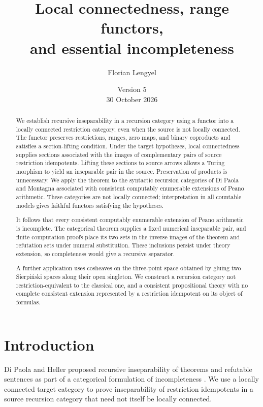 \documentclass[11pt]{article}
\title{Local connectedness, range functors,\\
and essential incompleteness}
\author{Florian Lengyel}
\date{Version 5\\30 October 2026}
\begin{document}
\maketitle

\begin{abstract}
We establish recursive inseparability in a recursion category using a
functor into a locally connected restriction category, even when the
source is not locally connected. The functor preserves restrictions,
ranges, zero maps, and binary coproducts and satisfies a section-lifting
condition. Under the target hypotheses, local
connectedness supplies sections associated with the images of
complementary pairs of source restriction idempotents. Lifting these
sections to source arrows allows a Turing morphism to yield an
inseparable pair in the source. Preservation of products is unnecessary.
We apply the theorem to the syntactic recursion categories of Di Paola
and Montagna associated with consistent computably enumerable extensions
of Peano arithmetic. These categories are not locally connected;
interpretation in all countable models gives faithful functors
satisfying the hypotheses.

It follows that every consistent computably enumerable
extension of Peano arithmetic is incomplete. The categorical theorem
supplies a fixed numerical inseparable pair, and finite computation
proofs place its two sets in the inverse images of the theorem and
refutation sets under numeral substitution. These inclusions persist
under theory extension, so completeness would give a recursive separator.

A further application uses cosheaves on the three-point space obtained
by gluing two Sierpi\'nski spaces along their open singleton. We construct
a recursion category not restriction-equivalent to the classical one,
and a consistent propositional theory with no complete consistent
extension represented by a restriction idempotent on its object of
formulas.
\end{abstract}

\section{Introduction}

Di Paola and Heller proposed recursive inseparability of theorems and
refutable sentences as part of a categorical formulation of
incompleteness \cite[pp.~594--595]{DPH}. We use a locally connected
target category to prove inseparability of restriction idempotents in
a source recursion category that need not itself be locally connected.
\end{document}
